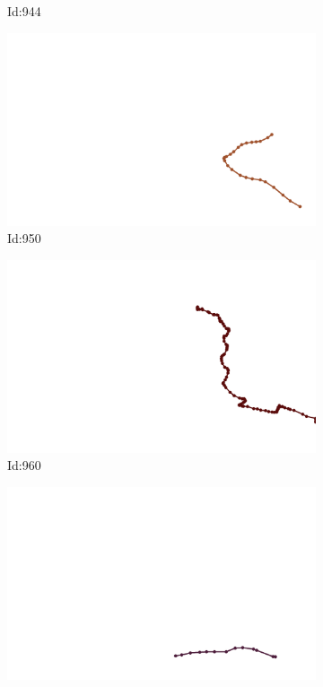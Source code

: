 \documentclass[12pt,twoside]{report}
\begin{document}
\begin{figure}
\begin{subfigure}[b]{0.20\textwidth}
\caption{Id:944}
\end{subfigure}
\begin{subfigure}[b]{0.20\textwidth}
\centering
\includegraphics[width=\textwidth]{../trajectories/950.png}
\caption{Id:950}
\end{subfigure}
\begin{subfigure}[b]{0.20\textwidth}
\centering
\includegraphics[width=\textwidth]{../trajectories/960.png}
\caption{Id:960}
\end{subfigure}
\begin{subfigure}[b]{0.20\textwidth}
\centering
\includegraphics[width=\textwidth]{../trajectories/970.png}

\end{subfigure}
\end{figure}
\end{document}
